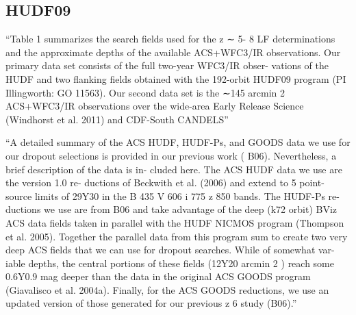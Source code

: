   \subsection{HUDF09}

  ``Table 1 summarizes the search fields used for the z ∼ 5-
    8 LF determinations and the approximate depths of the
    available ACS+WFC3/IR observations. Our primary
    data set consists of the full two-year WFC3/IR obser-
    vations of the HUDF and two flanking fields obtained
    with the 192-orbit HUDF09 program (PI Illingworth:
    GO 11563). Our second data set is the ∼145 arcmin 2
    ACS+WFC3/IR observations over the wide-area Early
    Release Science (Windhorst et al. 2011) and CDF-South
    CANDELS'' \cite{bouwens12}
    
  ``A detailed summary of the ACS HUDF, HUDF-Ps, and GOODS
    data we use for our dropout selections is provided in our previous
    work ( B06). Nevertheless, a brief description of the data is in-
    cluded here. The ACS HUDF data we use are the version 1.0 re-
    ductions of Beckwith et al. (2006) and extend to 5  point-source
    limits of 29Y30 in the B 435 V 606 i 775 z 850 bands. The HUDF-Ps re-
    ductions we use are from B06 and take advantage of the deep
    (k72 orbit) BViz ACS data fields taken in parallel with the HUDF
    NICMOS program (Thompson et al. 2005). Together the parallel
    data from this program sum to create two very deep ACS fields
    that we can use for dropout searches. While of somewhat var-
    iable depths, the central portions of these fields (12Y20 arcmin 2 )
    reach some 0.6Y0.9 mag deeper than the data in the original ACS
    GOODS program (Giavalisco et al. 2004a). Finally, for the ACS
    GOODS reductions, we use an updated version of those generated
    for our previous z 6 study (B06).'' \cite{bouwens06}

